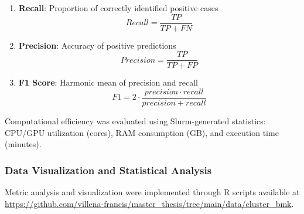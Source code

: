 \begin{enumerate}[leftmargin=\parindent]
    
    \item \textbf{Recall}: Proportion of correctly identified positive cases
    \begin{equation}
        \label{eq:recall}
        Recall = \frac{TP}{TP + FN}
    \end{equation}

    \item \textbf{Precision}: Accuracy of positive predictions
    \begin{equation}
        \label{eq:precision}
        Precision = \frac{TP}{TP + FP}
    \end{equation}

    \item \textbf{F1 Score}: Harmonic mean of precision and recall
    \begin{equation}
        \label{eq:f1score}
        F1 = 2 \cdot \frac{precision \cdot recall}{precision + recall}
    \end{equation}

\end{enumerate}

Computational efficiency was evaluated using Slurm-generated statistics: CPU/GPU 
utilization (cores), RAM consumption (GB), and execution time (minutes).

\subsubsection{Data Visualization and Statistical Analysis}

Metric analysis and visualization were implemented through R scripts available 
at \url{https://github.com/villena-francis/master_thesis/tree/main/data/cluster_bmk}.







